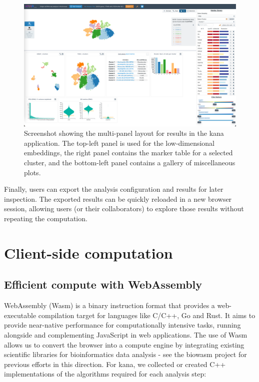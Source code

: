 \documentclass{article}
\begin{document}
\begin{figure}[htbp]
\begin{center}
\includegraphics[width=\textwidth]{screenshots/results.png}
\end{center}
\caption{Screenshot showing the multi-panel layout for results in the kana application.
The top-left panel is used for the low-dimensional embeddings,
the right panel contains the marker table for a selected cluster,
and the bottom-left panel contains a gallery of miscellaneous plots.}
\label{screenshot:results}
\end{figure}

Finally, users can export the analysis configuration and results for later inspection.
The exported results can be quickly reloaded in a new browser session, allowing users (or their collaborators) to explore those results without repeating the computation.

\section{Client-side computation}

\subsection{Efficient compute with WebAssembly}

WebAssembly (Wasm) \cite{haas2017bringing} is a binary instruction format that provides a web-executable compilation target for languages like C/C++, Go and Rust.
It aims to provide near-native performance for computationally intensive tasks, running alongside and complementing JavaScript in web applications.
The use of Wasm allows us to convert the browser into a compute engine by integrating existing scientific libraries for bioinformatics data analysis -
see the biowasm project \cite{biowasm} for previous efforts in this direction.
For kana, we collected or created C++ implementations of the algorithms required for each analysis step:
\end{document}
